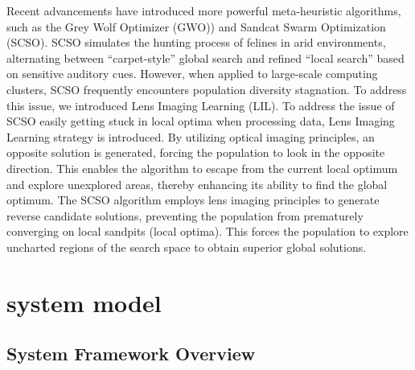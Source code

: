 \documentclass[conference]{{IEEEtran}}
\begin{document}
Recent advancements have introduced more powerful meta-heuristic algorithms, such as the Grey Wolf Optimizer (GWO))\cite{bresson2024kagnns} and Sandcat Swarm Optimization (SCSO)\cite{qasim2024chaotic}. SCSO simulates the hunting process of felines in arid environments, alternating between “carpet-style” global search and refined “local search” based on sensitive auditory cues. However, when applied to large-scale computing clusters, SCSO frequently encounters population diversity stagnation. To address this issue, we introduced Lens Imaging Learning (LIL)\cite{ranganna2024fitness}. To address the issue of SCSO easily getting stuck in local optima when processing data, Lens Imaging Learning strategy is introduced. By utilizing optical imaging principles, an opposite solution is generated, forcing the population to look in the opposite direction. This enables the algorithm to escape from the current local optimum and explore unexplored areas, thereby enhancing its ability to find the global optimum. The SCSO algorithm employs lens imaging principles to generate reverse candidate solutions, preventing the population from prematurely converging on local sandpits (local optima). This forces the population to explore uncharted regions of the search space to obtain superior global solutions.

\section{system model}

\subsection{System Framework Overview}
\end{document}
